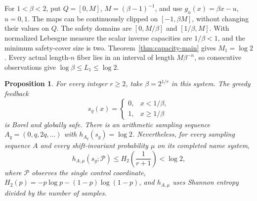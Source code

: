 \documentclass[11pt,reqno]{amsart}
\numberwithin{equation}{section}
\newtheorem{proposition}[theorem]{Proposition}
\theoremstyle{definition}
\begin{document}
For $1<\beta<2$, put $Q=[0,M]$, $M=(\beta-1)^{-1}$, and use
$g_u(x)=\beta x-u$, $u=0,1$. The maps can be continuously clipped
on $[-1,\beta M]$, without changing their values on $Q$.
The safety domains are $[0,M/\beta]$ and $[1/\beta,M]$.
With normalized Lebesgue measure the scalar inverse capacities
are $1/\beta<1$, and the minimum safety-cover size is two.
Theorem~\ref{thm:capacity-main} gives $M_1=\log2$.
Every actual length-$n$ fiber lies in an interval of length
$M\beta^{-n}$, so consecutive observations give
$\log\beta\le L_1\le\log2$.

\begin{proposition}\label{prop:shannon-boundary}
For every integer $r\ge2$, take $\beta=2^{1/r}$ in this system.
The greedy feedback
\[
 s_g(x)=\begin{cases}0,&x<1/\beta,\\1,&x\ge1/\beta\end{cases}
\]
is Borel and globally safe. There is an arithmetic sampling
sequence $A_q=(0,q,2q,\ldots)$ with $h_{A_q}(s_g)=\log2$.
Nevertheless, for every sampling sequence $A$ and every
shift-invariant probability $\mu$ on its completed name system,
\[
 h_{A,\mu}(s_g;\mathcal P)\le
 H_2\left(\frac1{r+1}\right)<\log2,
\]
where $\mathcal P$ observes the single control coordinate,
$H_2(p)=-p\log p-(1-p)\log(1-p)$, and $h_{A,\mu}$ uses Shannon
entropy divided by the number of samples.
\end{proposition}
\end{document}
